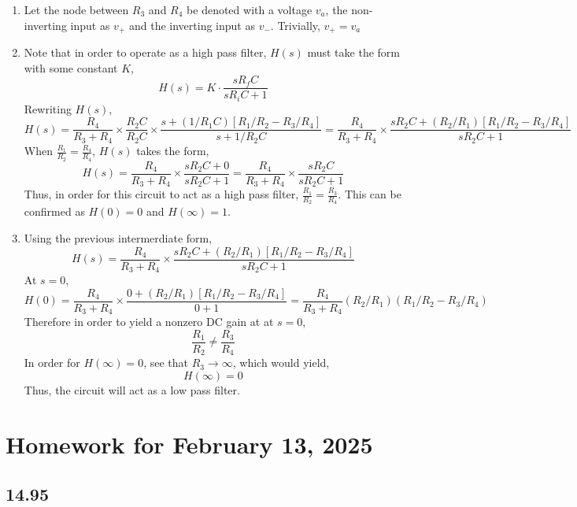\documentclass{article}
\begin{document}
\begin{enumerate}[label=(\alph*)]
    \item Let the node between $R_3$ and $R_4$ be denoted with a voltage $v_a$, the non-inverting input as $v_+$ and the inverting input as $v_-$. 
        Trivially, $v_+=v_a$
    \item Note that in order to operate as a high pass filter, $H(s)$ must take the form with some constant $K$,
        $$H(s)=K\cdot \frac{sR_fC}{sR_iC + 1}$$
        Rewriting $H(s)$, $$H(s)=\frac{R_4}{R_3 + R_4} \times \frac{R_2C}{R_2C} \times \frac{s + (1/R_1C)[R_1/R_2 - R_3/R_4]}{s + 1/R_2C}=\frac{R_4}{R_3 + R_4} \times \frac{sR_2C + (R_2/R_1)[R_1/R_2 - R_3/R_4]}{sR_2C + 1}$$
        When $\frac{R_1}{R_2}=\frac{R_4}{R_4}$, $H(s)$ takes the form,
        $$H(s)=\frac{R_4}{R_3 + R_4} \times \frac{sR_2C + 0}{sR_2C + 1}=\frac{R_4}{R_3 + R_4} \times \frac{sR_2C}{sR_2C + 1}$$
        Thus, in order for this circuit to act as a high pass filter, $\frac{R_1}{R_2}=\frac{R_3}{R_4}$.
        This can be confirmed as $H(0)=0$ and $H(\infty)=1$.
    \item 
        Using the previous intermerdiate form, $$H(s)=\frac{R_4}{R_3 + R_4} \times \frac{sR_2C + (R_2/R_1)[R_1/R_2 - R_3/R_4]}{sR_2C + 1}$$
        At $s=0$, $$H(0)=\frac{R_4}{R_3 + R_4} \times \frac{0 + (R_2/R_1)[R_1/R_2 - R_3/R_4]}{0 + 1}=\frac{R_4}{R_3 + R_4} (R_2/R_1)(R_1/R_2 - R_3/R_4)$$
        Therefore in order to yield a nonzero DC gain at at $s=0$, $$\frac{R_1}{R_2} \neq \frac{R_3}{R_4}$$
        In order for $H(\infty)=0$, see that $R_3\rightarrow \infty$, which would yield,
        $$H(\infty)=0$$
        Thus, the circuit will act as a low pass filter.

\end{enumerate}


\section*{Homework for February 13, 2025}

\subsection*{14.95}
\end{document}
